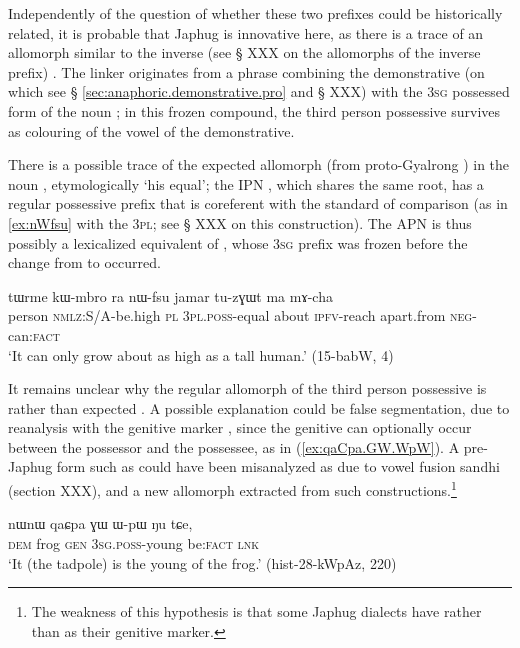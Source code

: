 Independently of the question of whether these two prefixes could be historically related, it is probable that Japhug is innovative here, as there is a trace of an allomorph  similar to the inverse (see § XXX on the allomorphs of the inverse prefix) . The linker  originates from a phrase combining the demonstrative  (on which see § \ref{sec:anaphoric.demonstrative.pro} and § XXX) with the \textsc{3sg} possessed form of the noun ; in this frozen compound, the third person possessive survives as colouring of the vowel of the demonstrative.

There is a possible trace of the expected allomorph  (from proto-Gyalrong ) in the noun , etymologically `his equal'; the IPN , which shares the same root, has a regular possessive prefix that is coreferent with the standard of comparison (as in \ref{ex:nWfsu} with the \textsc{3pl}; see § XXX on this construction). The APN  is thus possibly a lexicalized equivalent of , whose \textsc{3sg} prefix was frozen before the change from  to  occurred.

\begin{exe}
\ex \label{ex:nWfsu}
\gll tɯrme kɯ-mbro ra nɯ-fsu jamar tu-zɣɯt ma mɤ-cha \\
person \textsc{nmlz}:S/A-be.high \textsc{pl}  \textsc{3pl.poss}-equal about \textsc{ipfv}-reach apart.from \textsc{neg}-can:\textsc{fact} \\
\glt `It can only grow about as high as a tall human.' (15-babW, 4)
\end{exe}


It remains unclear why the regular allomorph of the third person possessive is  rather than expected . A possible explanation could be false segmentation, due to reanalysis with the genitive marker , since the genitive can optionally occur between the possessor and the possessee, as in (\ref{ex:qaCpa.GW.WpW}). A pre-Japhug form such as  could have been misanalyzed as  due to vowel fusion sandhi (section XXX), and a new allomorph  extracted from such constructions.\footnote{The weakness of this hypothesis is that some Japhug dialects have  rather than  as their genitive marker.}

\begin{exe}
\ex \label{ex:qaCpa.GW.WpW}
 \gll nɯnɯ qaɕpa ɣɯ ɯ-pɯ ŋu tɕe, \\
 \textsc{dem} frog \textsc{gen} \textsc{3sg.poss}-young be:\textsc{fact} \textsc{lnk} \\
 \glt `It (the tadpole) is the young of the frog.' (hist-28-kWpAz, 220)
\end{exe} 


